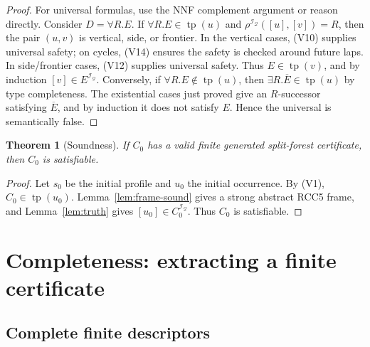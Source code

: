 \documentclass[11pt]{article}
\newtheorem{theorem}{Theorem}[section]
\newcommand{\I}{\mathcal I}
\newcommand{\Q}{\mathcal Q}
\newcommand{\typ}{\operatorname{tp}}
\begin{document}
\begin{proof}
For universal formulas, use the NNF complement argument or reason directly.  Consider $D=\forall R.E$.  If $\forall R.E\in\typ(u)$ and $\rho^{\I_\Q}([u],[v])=R$, then the pair $(u,v)$ is vertical, side, or frontier.  In the vertical cases, (V10) supplies universal safety; on cycles, (V14) ensures the safety is checked around future laps.  In side/frontier cases, (V12) supplies universal safety.  Thus $E\in\typ(v)$, and by induction $[v]\in E^{\I_\Q}$.  Conversely, if $\forall R.E\notin\typ(u)$, then $\exists R.\overline E\in\typ(u)$ by type completeness.  The existential cases just proved give an $R$-successor satisfying $\overline E$, and by induction it does not satisfy $E$.  Hence the universal is semantically false.
\end{proof}

\begin{theorem}[Soundness]\label{thm:soundness}
If $C_0$ has a valid finite generated split-forest certificate, then $C_0$ is satisfiable.
\end{theorem}

\begin{proof}
Let $s_0$ be the initial profile and $u_0$ the initial occurrence.  By (V1), $C_0\in\typ(u_0)$.  Lemma~\ref{lem:frame-sound} gives a strong abstract RCC5 frame, and Lemma~\ref{lem:truth} gives $[u_0]\in C_0^{\I_\Q}$.  Thus $C_0$ is satisfiable.
\end{proof}

\section{Completeness: extracting a finite certificate}

\subsection{Complete finite descriptors}
\end{document}
